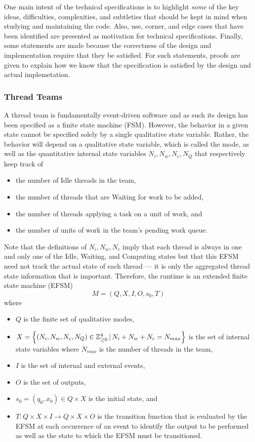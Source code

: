 \documentclass{article}
\newcommand{\Z}                 {{\mathbb Z}}
\begin{document}
One main intent of the technical specifications is to highlight \textit{some} of
the key ideas, difficulties, complexities, and subtleties that should be kept in
mind when studying and maintaining the code.  Also, use, corner, and edge cases
that have been identified are presented as motivation for technical
specifications.  Finally, some statements are made because the correctness of
the design and implementation require that they be satisfied.  For such
statements, proofs are given to explain how we know that the specification is
satisfied by the design and actual implemetation.

\subsubsection{Thread Teams}
A thread team is fundamentally event-driven software and as such its design has
been specified as a finite state machine (FSM).  However, the behavior in a
given state cannot be specified solely by a single qualitative state variable.
Rather, the behavior will depend on a qualitative state variable, which is
called the mode, as well as the quantitative internal state variables $N_i, N_w,
N_c, N_Q$ that respectively keep track of 
\begin{itemize}
\item{the number of Idle threads in the team,}
\item{the number of threads that are Waiting for work to be added,}
\item{the number of threads applying a task on a unit of work, and}
\item{the number of units of work in the team's pending work queue.}
\end{itemize}
Note that the definitions of $N_i, N_w, N_c$ imply that each thread is
always in one and only one of the Idle, Waiting, and Computing states but that
this EFSM need not track the actual state of each thread --- it is only the
aggregated thread state information that is important.  Therefore, the runtime
is an extended finite state machine (EFSM)
\[
M = (Q, X, I, O, s_0, T)
\]
where
\begin{itemize}
\item{$Q$ is the finite set of qualitative modes,}
\item{$X = \set{(N_i, N_w, N_c, N_Q) \in \Z_{\ge 0}^4\,|\,N_i + N_w + N_c =
N_{max}}$ is the set of internal state variables where $N_{max}$ is the
number of threads in the team,}
\item{$I$ is the set of internal and external events,}
\item{$O$ is the set of outputs,}
\item{$s_0 = (q_0, x_0) \in Q \times X$ is the initial state, and}
\item{$T : Q \times X \times I \to Q \times X \times O$ is the transition
function that is evaluated by the EFSM at each occurrence of an event to
identify the output to be performed as well as the state to which the EFSM must
be transitioned.}
\end{itemize}
\end{document}
